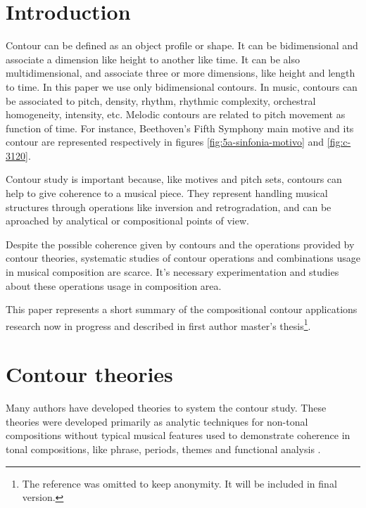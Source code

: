 

\section{Introduction}
\label{sec:introduction}

Contour can be defined as an object profile or shape. It can be
bidimensional and associate a dimension like height to another like
time. It can be also multidimensional, and associate three or more
dimensions, like height and length to time. In this paper we use only
bidimensional contours. In music, contours can be associated to pitch,
density, rhythm, rhythmic complexity, orchestral homogeneity,
intensity, etc. Melodic contours are related to pitch movement as
function of time. For instance, Beethoven's Fifth Symphony main motive
and its contour are represented respectively in figures
\ref{fig:5a-sinfonia-motivo} and \ref{fig:c-3120}.

Contour study is important because, like motives and pitch sets,
contours can help to give coherence to a musical piece. They represent
handling musical structures through operations like inversion and
retrogradation, and can be aproached by analytical or compositional
points of view.

Despite the possible coherence given by contours and the operations
provided by contour theories, systematic studies of contour operations
and combinations usage in musical composition are scarce. It's
necessary experimentation and studies about these operations usage in
composition area.

This paper represents a short summary of the compositional contour
applications research now in progress and described in first author
master's thesis\footnote{The reference was omitted to keep
  anonymity. It will be included in final version.}.

\section{Contour theories}
\label{sec:contour-theories}

Many authors
\cite{friedmann85:methodology,friedmann87:response,morris87:composition,morris93:directions,marvin.ea87:relating,marvin88:generalized,marvin.ea95:generalization,polansky.ea92:possible,quinn97:fuzzy,clifford95:contour,beard03:contour}
have developed theories to system the contour study. These theories
were developed primarily as analytic techniques for non-tonal
compositions without typical musical features used to demonstrate
coherence in tonal compositions, like phrase, periods, themes and
functional analysis \cite{beard03:contour}.

